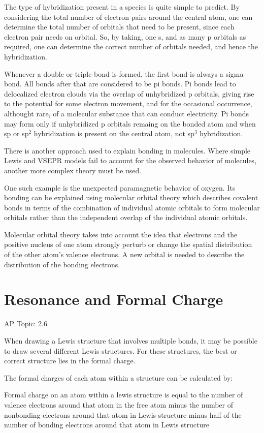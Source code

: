 \documentclass[../chem.tex]{subfiles}
\begin{document}
The type of hybridization present in a species is quite simple to predict. By considering the total number of electron pairs around the central atom, 
one can determine the total number of orbitals that need to be present, since each electron pair needs on orbital. So, by taking, one s, and as many p 
orbitals as required, one can determine the correct number of orbitals needed, and hence the hybridization.

Whenever a double or triple bond is formed, the first bond is always a sigma bond. All bonds after that are considered to be pi bonds. 
Pi bonds lead to delocalized electron clouds via the overlap of unhybridized p orbitals, giving rise to the potential for some electron movement, 
and for the occasional occurrence, althought rare, of a molecular substance that can conduct electricity. Pi bonds may form only if unhybridized
p orbitals remaing on the bonded atom and when sp or sp$^2$ hybridization is present on the central atom, not sp$^3$ hybridization.

There is another approach used to explain bonding in molecules. Where simple Lewis and VSEPR models fail to account for the 
observed behavior of molecules, another more complex theory must be used.

One such example is the unexpected paramagnetic behavior of oxygen. Its bonding can be explained using molecular orbital theory which describes covalent bonds 
in terms of the combination of individual atomic orbitals to form molecular orbitals rather than the independent overlap of the individual atomic orbitals.

Molecular orbital theory takes into account the idea that electrons and the positive nucleus of one atom strongly perturb or change the spatial 
distribution of the other atom's valence electrons. A new orbital is needed to describe the distribution of the bonding electrons.

\section{Resonance and Formal Charge}
AP Topic: 2.6

When drawing a Lewis structure that involves multiple bonds, it may be possible to draw several different Lewis structures. 
For these structures, the best or correct structure lies in the formal charge.

The formal charges of each atom within a structure can be calculated by:

Formal charge on an atom within a lewis structure is equal to the number of valence electrons around that atom in the free atom minus the number 
of nonbonding electrons around that atom in Lewis structure minus half of the number of bonding electrons around that atom in Lewis structure 
\end{document}
